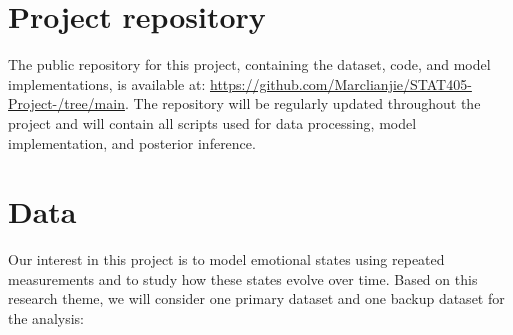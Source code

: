 \documentclass[a4paper,11pt]{article}
\author{
Marc Shi (56215593), Yu Chang \\
\small Departmentb of Statistics / University of British Columbia \\
\small \texttt{lianjies@student.ubc.ca}
}
\title{\vspace{-\baselineskip}\mytitle}
\date{\today}
\begin{document}
\maketitle
\thispagestyle{fancy}
\section{Project repository}
The public repository for this project, containing the dataset, code, and model implementations, is available at:
\url{https://github.com/Marclianjie/STAT405-Project-/tree/main}.
The repository will be regularly updated throughout the project and will contain all scripts used for data processing, model implementation, and posterior inference.

\section{Data}Our interest in this project is to model emotional states using repeated measurements and to study how these states evolve over time. Based on this research theme, we will consider one primary dataset and one backup dataset for the analysis:
\end{document}
